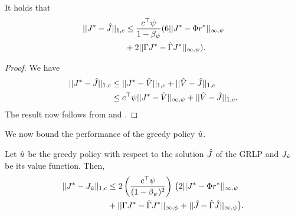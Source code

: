\begin{theorem}
\label{cmt2mn}
It holds that
\begin{align}\label{finalbndmn}
\begin{split}
||J^*-\hj||_{1,c}
&\leq\frac{c^\top\psi}{1-\beta_\psi}(6 ||J^*-\Phi r^*||_{\mn}\\
&+2||\Gamma J^*-\hg J^*||_{\mn}).
\end{split}
\end{align}
\end{theorem}
\begin{proof}
We have
\begin{align}
||J^*-\hat{J}||_{1,c}\nonumber
&\leq||J^*-\hat{V}||_{1,c}+||\hat{V}-\hat{J}||_{1,c}\nonumber\\
&\leq c^\top \psi ||J^*-\hat{V}||_{\infty,\psi}+||\hat{V}-\hat{J}||_{1,c}.\nonumber
\end{align}
The result now follows from  and .
\end{proof}
We now bound the performance of the greedy policy $\hat{u}$.
\begin{theorem}
\label{polthe}
Let $\hat{u}$ be the greedy policy with respect to the solution $\hat{J}$ of the GRLP and $J_{\hat{u}}$ be its value function.
Then,
\begin{align}\label{polthebnd}
\norm{J^* - J_{\hu}}_{1,c}
&\leq 2\left(\frac{c^\top \psi}{(1-\beta_{\psi})^2}\right)\, \big( 2||J^*-\Phi r^*||_{\mn}
\nn\\&
+||\Gamma J^*-\hg J^*||_{\mn}+||\hj-\hg\hj||_{\mn}\big).
\end{align}
\end{theorem}
